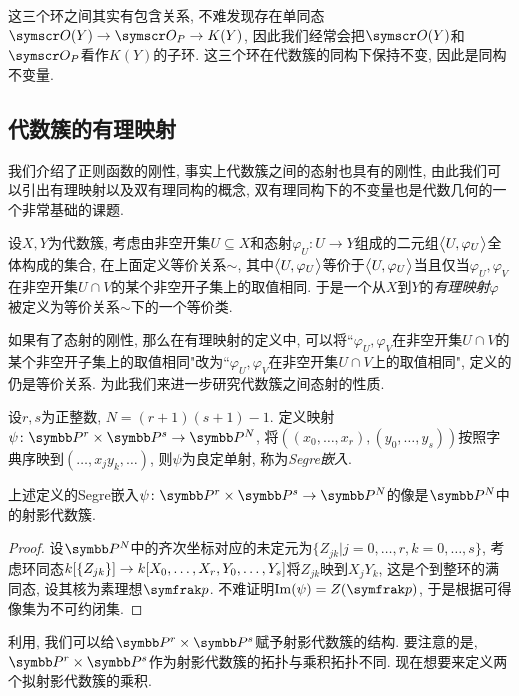 这三个环之间其实有包含关系, 不难发现存在单同态$\OO (Y)\to \OO_P\to K(Y)$, 因此我们经常会把$\OO (Y)$和$\OO_P$看作$K(Y)$的子环. 这三个环在代数簇的同构下保持不变, 因此是同构不变量.

\subsection{代数簇的有理映射}

我们介绍了正则函数的刚性, 事实上代数簇之间的态射也具有的刚性, 由此我们可以引出有理映射以及双有理同构的概念, 双有理同构下的不变量也是代数几何的一个非常基础的课题.

设$X, Y$为代数簇, 考虑由非空开集$U\subseteq X$和态射$\varphi_U\colon U\to Y$组成的二元组$\lrbig<>{U, \varphi_U}$全体构成的集合, 在上面定义等价关系$\sim$, 其中$\lrbig<>{U, \varphi_U}$等价于$\lrbig<>{U, \varphi_U}$当且仅当$\varphi_U, \varphi_V$在非空开集$U\cap V$的某个非空开子集上的取值相同. 于是一个从$X$到$Y$的\emph{有理映射}$\varphi$被定义为等价关系$\sim$下的一个等价类.

如果有了态射的刚性, 那么在有理映射的定义中, 可以将``$\varphi_U, \varphi_V$在非空开集$U\cap V$的某个非空开子集上的取值相同"改为``$\varphi_U, \varphi_V$在非空开集$U\cap V$上的取值相同", 定义的仍是等价关系. 为此我们来进一步研究代数簇之间态射的性质.

\begin{definition}
  设$r, s$为正整数, $N=(r+1)(s+1)-1$. 定义映射$\psi\colon \PP^r\times\PP^s\to\PP^N$, 将$((x_0, \dotsc, x_r), (y_0, \dotsc, y_s))$按照字典序映到$(\dotsc, x_jy_k, \dotsc)$, 则$\psi$为良定单射, 称为\emph{Segre嵌入}.
\end{definition}

\begin{proposition}\label{prop:segreembedding}
  上述定义的Segre嵌入$\psi\colon \PP^r\times\PP^s\to\PP^N$的像是$\PP^N$中的射影代数簇.
\end{proposition}

\begin{proof}
  设$\PP^N$中的齐次坐标对应的未定元为$\{Z_{jk}\vert j=0, \dotsc, r, k=0, \dotsc, s\}$, 考虑环同态$\kk [\{Z_{jk}\}]\to \kk [X_0, \dotsc, X_r, Y_0, \dotsc, Y_s]$将$Z_{jk}$映到$X_jY_k$, 这是个到整环的满同态, 设其核为素理想$\ideal{p}$. 不难证明$\Im (\psi)=Z(\ideal{p})$, 于是根据可得像集为不可约闭集.
\end{proof}

利用, 我们可以给$\PP^r\times\PP^s$赋予射影代数簇的结构. 要注意的是, $\PP^r\times\PP^s$作为射影代数簇的拓扑与乘积拓扑不同. 现在想要来定义两个拟射影代数簇的乘积.

